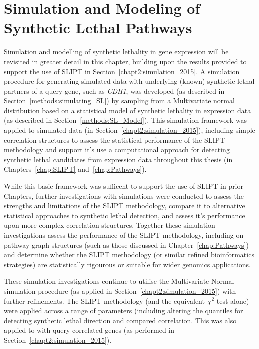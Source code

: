 \chapter{Simulation and Modeling of Synthetic Lethal Pathways}
\label{chap:simulation}

Simulation and modelling of synthetic lethality in gene expression will be revisited in greater detail in this chapter, building upon the results provided to support the use of \gls{SLIPT} in Section~\ref{chapt2:simulation_2015}. A simulation procedure for generating simulated data with underlying (known) synthetic lethal partners of a query gene, such as \textit{CDH1}, was developed (as described in Section~\ref{methods:simulating_SL}) by sampling from a Multivariate normal distribution based on a statistical model of synthetic lethality in expression data (as described in Section~\ref{methods:SL_Model}). This simulation framework was applied to simulated data (in Section~\ref{chapt2:simulation_2015}), including simple correlation structures to assess the statistical performance of the \gls{SLIPT} methodology and support it's use a computational approach for detecting synthetic lethal candidates from expression data throughout this thesis (in Chapters~\ref{chap:SLIPT} and~\ref{chap:Pathways}). 

While this basic framework was sufficent to support the use of \gls{SLIPT} in prior Chapters, further investigations with simulations were conducted to assess the strengths and limitations of the \gls{SLIPT} methodology, compare it to alternative statistical approaches to synthetic lethal detection, and assess it's performance upon more complex correlation structures. Together these simulation investigations assess the performance of the \gls{SLIPT} methodology, including on pathway graph structures (such as those discussed in Chapter~\ref{chap:Pathways}) and determine whether the \gls{SLIPT} methodology (or similar refined bioinformatics strategies) are statistically rigourous or suitable for wider genomics applications.

These simulation investigations continue to utilise the Multivariate Normal simulation procedure (as applied in Section~\ref{chapt2:simulation_2015}) with further refinements. The \gls{SLIPT} methodology (and the equivalent $\chi^2$ test alone) were applied across a range of parameters (including altering the quantiles for detecting synthetic lethal direction and compared correlation. This was also applied to with query correlated genes (as performed in Section~\ref{chapt2:simulation_2015}).

